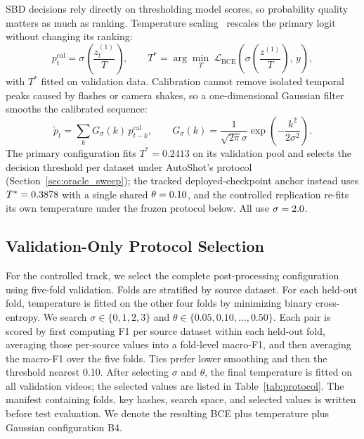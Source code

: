 SBD decisions rely directly on thresholding model scores, so probability
quality matters as much as ranking. Temperature
scaling~\cite{guo2017calibration} rescales the primary logit without
changing its ranking:
\begin{equation}
    p^{\mathrm{cal}}_t=\sigma\!\left(\frac{z^{(1)}_t}{T}\right),\qquad
    T^{*}=\arg\min_{T}\ \mathcal{L}_{\mathrm{BCE}}\!\left(\sigma\!\left(\frac{z^{(1)}}{T}\right),\,y\right),
    \label{eq:temperature}
\end{equation}
with $T^{*}$ fitted on validation data. Calibration cannot remove isolated
temporal peaks caused by flashes or camera shakes, so a one-dimensional
Gaussian filter smooths the calibrated sequence:
\begin{equation}
    \tilde p_t=\sum_k G_{\sigma}(k)\,p^{\mathrm{cal}}_{t-k},\qquad
    G_{\sigma}(k)=\frac{1}{\sqrt{2\pi}\sigma}\exp\!\left(-\frac{k^2}{2\sigma^2}\right).
    \label{eq:gaussian}
\end{equation}
The primary configuration fits $T^{*}=0.2413$ on its validation pool and
selects the decision threshold per dataset under AutoShot's protocol
(Section~\ref{sec:oracle_sweep}); the tracked deployed-checkpoint anchor
instead uses $T^{*}=0.3878$ with a single shared
$\theta=0.10$, and the controlled replication re-fits its own
temperature under the frozen protocol below. All use $\sigma=2.0$.

\subsection{Validation-Only Protocol Selection}
\label{sec:protocol}

For the controlled track, we select the complete post-processing configuration using
five-fold validation. Folds are stratified by source dataset. For each
held-out fold, temperature is fitted on the other four folds by minimizing
binary cross-entropy. We search $\sigma\in\{0,1,2,3\}$ and
$\theta\in\{0.05,0.10,\ldots,0.50\}$. Each pair is scored by first computing
F1 per source dataset within each held-out fold, averaging those per-source
values into a fold-level macro-F1, and then averaging the macro-F1 over the
five folds. Ties prefer lower smoothing and then the threshold nearest 0.10.
After selecting $\sigma$ and $\theta$, the final temperature is fitted on
all validation videos; the selected values are listed in
Table~\ref{tab:protocol}. The manifest containing folds, key hashes, search
space, and selected values is written before test evaluation. We denote the
resulting BCE plus temperature plus Gaussian configuration B4.

